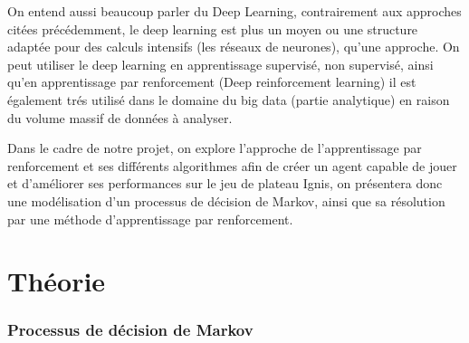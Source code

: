\documentclass[a4paper,10pt]{article}
\begin{document}
\par
On entend aussi beaucoup parler du Deep Learning, contrairement aux approches citées précédemment, le deep learning est plus un moyen ou une structure adaptée pour des calculs intensifs (les réseaux de neurones), qu'une approche. On peut utiliser le deep learning en apprentissage supervisé, non supervisé, ainsi qu'en apprentissage par renforcement (Deep reinforcement learning) il est également trés utilisé dans le domaine du big data (partie analytique) en raison du volume massif de données à analyser.


\par
Dans le cadre de notre projet, on explore l'approche de l'apprentissage par renforcement et ses différents algorithmes afin de créer un agent capable de jouer et d'améliorer ses performances sur le jeu de plateau Ignis, on présentera donc une modélisation d'un processus de décision de Markov, ainsi que sa résolution par une méthode d'apprentissage par renforcement.


\part{Théorie}
\section{Processus de décision de Markov}
\end{document}
